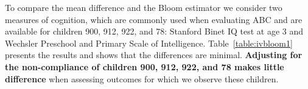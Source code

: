 \noindent To compare the mean difference and the Bloom estimator we consider two measures of cognition, which are commonly used when evaluating ABC and are available for children 900, 912, 922, and 78: Stanford Binet IQ test at age 3 and Wechsler Preschool and Primary Scale of Intelligence. Table~\ref{table:ivbloom1} presents the results and shows that the differences are minimal. \textbf{Adjusting for the non-compliance of children 900, 912, 922, and 78 makes little difference} when assessing outcomes for which we observe these children. 

\noindent 




 